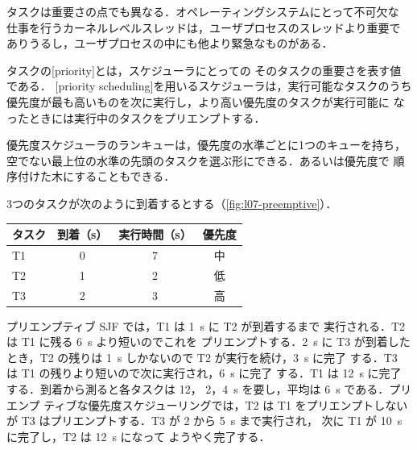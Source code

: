 \documentclass[../main.tex]{subfiles}
\begin{document}
タスクは重要さの点でも異なる．オペレーティングシステムにとって不可欠な
仕事を行うカーネルレベルスレッドは，ユーザプロセスのスレッドより重要で
ありうるし，ユーザプロセスの中にも他より緊急なものがある．

\begin{definition}[優先度]
  タスクの[priority]とは，スケジューラにとっての
  そのタスクの重要さを表す値である．
  [priority scheduling]を用いるスケジューラは，実行可能なタスクのうち
  優先度が最も高いものを次に実行し，より高い優先度のタスクが実行可能に
  なったときには実行中のタスクをプリエンプトする．
\end{definition}

優先度スケジューラのランキューは，優先度の水準ごとに1つのキューを持ち，
空でない最上位の水準の先頭のタスクを選ぶ形にできる．あるいは優先度で
順序付けた木にすることもできる．

\begin{example}
  \label{ex:l07-preemptive}
  3つのタスクが次のように到着するとする（\cref{fig:l07-preemptive}）．

  \begin{center}\small
  \begin{tabular}{@{}lccc@{}}
    \toprule
    タスク & 到着（s） & 実行時間（s） & 優先度 \\
    \midrule
    T1 & 0 & 7 & 中 \\
    T2 & 1 & 2 & 低 \\
    T3 & 2 & 3 & 高 \\
    \bottomrule
  \end{tabular}
  \end{center}

  プリエンプティブ SJF では，T1 は \SI{1}{\second} に T2 が到着するまで
  実行される．T2 は T1 に残る \SI{6}{\second} より短いのでこれを
  プリエンプトする．\SI{2}{\second} に T3 が到着したとき，T2 の残りは
  \SI{1}{\second} しかないので T2 が実行を続け，\SI{3}{\second} に完了
  する．T3 は T1 の残りより短いので次に実行され，\SI{6}{\second} に完了
  する．T1 は \SI{12}{\second} に完了する．到着から測ると各タスクは 12，
  2，\SI{4}{\second} を要し，平均は \SI{6}{\second} である．プリエンプ
  ティブな優先度スケジューリングでは，T2 は T1 をプリエンプトしないが
  T3 はプリエンプトする．T3 が 2 から \SI{5}{\second} まで実行され，
  次に T1 が \SI{10}{\second} に完了し，T2 は \SI{12}{\second} になって
  ようやく完了する．
\end{example}
\end{document}
